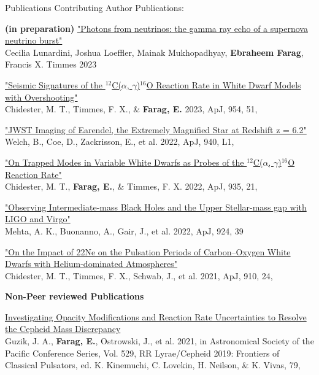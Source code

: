 \documentclass{resume} %
\begin{document}
\begin{rSection}{Publications}
    Contributing Author Publications: 
    \begin{revnumerate}
        \item \textbf{(in preparation)} \href{}{"Photons from neutrinos: the gamma ray echo of a supernova neutrino burst"} 
        \\ Cecilia Lunardini, Joshua Loeffler, Mainak Mukhopadhyay, \textbf{Ebraheem Farag}, Francis X. Timmes 2023
        \item \href{https://doi.org/10.3847/1538-4357/ace620}{"Seismic Signatures of the $^{12}$C($\alpha$, $\gamma$)$^{16}$O Reaction Rate in White Dwarf Models with Overshooting"}
        \\ Chidester, M. T., Timmes, F. X., \& \textbf{Farag, E.} 2023, ApJ, 954, 51,\\
        
        \item \href{https://doi.org/10.3847/2041-8213/ac9d39}{"JWST Imaging of Earendel, the Extremely Magnified Star at Redshift z = 6.2"}
        \\ Welch, B., Coe, D., Zackrisson, E., et al. 2022, ApJ, 940, L1,
        
        \item \href{https://doi.org/10.3847/1538-4357/ac7ec3}{"On Trapped Modes in Variable White Dwarfs as Probes of the $^{12}$C($\alpha$, $\gamma$)$^{16}$O Reaction Rate"}
        \\ Chidester, M. T., \textbf{Farag, E.}, \& Timmes, F. X. 2022, ApJ, 935, 21,
        
        \item \href{https://doi.org/10.3847/1538-4357/ac3130}{"Observing Intermediate-mass Black Holes and the Upper Stellar-mass gap with LIGO and Virgo"}
        \\ Mehta, A. K., Buonanno, A., Gair, J., et al. 2022, ApJ, 924, 39
        
        \item \href{https://doi.org/10.3847/1538-4357/abdec4}{"On the Impact of 22Ne on the Pulsation Periods of Carbon–Oxygen White Dwarfs with Helium-dominated Atmospheres"}
        \\ Chidester, M. T., Timmes, F. X., Schwab, J., et al. 2021, ApJ, 910, 24,
    \end{revnumerate}

\textbf{Non-Peer reviewed Publications}
\begin{revnumerate}

\item \href{https://doi.org/10.48550/arXiv.2002.04073}{Investigating Opacity Modifications and Reaction Rate Uncertainties to Resolve the Cepheid Mass Discrepancy}
\\ Guzik, J. A., \textbf{Farag, E.}, Ostrowski, J., et al. 2021, in Astronomical Society of the Pacific Conference Series, Vol. 529, RR Lyrae/Cepheid 2019: Frontiers of Classical Pulsators, ed. K. Kinemuchi, C. Lovekin, H. Neilson, \& K. Vivas, 79, 


\end{revnumerate}
\end{rSection}
\end{document}
